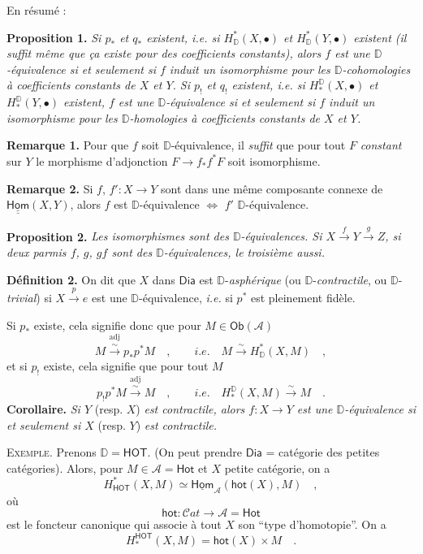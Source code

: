 \documentclass[11pt]{article}
\newcommand{\printedpage}[1]{\marginpar{\footnotesize p.~#1}}
\newcommand{\msp}[1]{\marginpar{\footnotesize [#1]}}
\newcommand{\Ob}{\mathsf{Ob}}
\newcommand{\Dia}{\mathsf{Dia}}
\newcommand{\DD}{\mathbb{D}}
\newcommand{\Hom}{\underline{\mathsf{Hom}}}
\newcommand{\HOT}{\mathsf{HOT}}
\newcommand{\cA}{\mathcal{A}}
\newcommand{\hot}{\mathsf{hot}}
\newcommand{\Hot}{\mathsf{Hot}}
\newcommand{\isolongto}{\overset{\sim}{\longrightarrow}}
\begin{document}
\clearpage
\printedpage{36}
\noindent\msp{page 62}

\noindent En résumé :

\noindent\textbf{Proposition 1.} \textit{Si $p_*$ et $q_*$ existent, i.e. si $H^*_{\DD}(X, \bullet)$ et $H^*_{\DD}(Y, \bullet)$ existent (il suffit même que ça existe pour des coefficients constants), alors $f$ est une $\DD$-équivalence si et seulement si $f$ induit un isomorphisme pour les $\DD$-cohomologies à coefficients constants de $X$ et $Y$. Si $p_!$ et $q_!$ existent, i.e. si $H^{\DD}_*(X, \bullet)$ et $H^{\DD}_*(Y, \bullet)$ existent, $f$ est une $\DD$-équivalence si et seulement si $f$ induit un isomorphisme pour les $\DD$-homologies à coefficients constants de $X$ et $Y$.}

\noindent\textbf{Remarque 1.} Pour que $f$ soit $\DD$-équivalence, il \textit{suffit} que pour tout $F$ \textit{constant} sur $Y$ le morphisme d'adjonction $F \to f_*f^*F$ soit isomorphisme.

\noindent\textbf{Remarque 2.} Si $f$, $f' : X \to Y$ sont dans une même composante connexe de $\underline{\Hom}(X, Y)$, alors $f$ est $\DD$-équivalence $\Leftrightarrow$ $f'$ $\DD$-équivalence.

\noindent\textbf{Proposition 2.} \textit{Les isomorphismes sont des $\DD$-équivalences. Si $X \overset{f}{\to} Y \overset{g}{\to} Z$, si deux parmis $f$, $g$, $gf$ sont des $\DD$-équivalences, le troisième aussi.} %

\noindent\textbf{Définition 2.} On dit que $X$ dans $\Dia$ est $\DD$-\textit{asphérique} (ou $\DD$-\textit{contractile}, ou $\DD$-\textit{trivial}) si $X \overset{p}{\to} e$ est une $\DD$-équivalence, \textit{i.e.} si $p^*$ est pleinement fidèle.

Si $p_*$ existe, cela signifie donc que pour $M \in \Ob(\cA)$
\[
M \overset{\mathrm{adj}}{\isolongto} p_*p^*M \quad , \qquad \textit{i.e.} \quad M \isolongto H^*_{\DD}(X, M) \quad ,
\]
et si $p_!$ existe, cela signifie que pour tout $M$
\[
p_!p^*M \overset{\mathrm{adj}}{\isolongto} M \quad , \qquad \textit{i.e.} \quad H^{\DD}_*(X, M) \isolongto M \quad .
\]
\textbf{Corollaire.} \textit{Si $Y$} (resp. $X$) \textit{est contractile, alors $f : X \to Y$ est une $\DD$-équivalence si et seulement si $X$} (resp. $Y$) \textit{est contractile.}

\noindent\textsc{Exemple}. Prenons $\DD = \HOT$. (On peut prendre $\Dia$ = catégorie des petites catégories). Alors, pour $M \in \cA = \Hot$ et $X$ petite catégorie, on a
\[
H^*_{\HOT}(X, M) \simeq \Hom_{\cA}(\hot(X), M) \quad ,
\]
où
\[
\hot : \mathcal{C}\mathit{at} \longrightarrow \cA = \Hot
\]
est le foncteur canonique qui associe à tout $X$ son “type d'homotopie”. On a
\[
H^{\HOT}_*(X, M) = \hot(X) \times M \quad .
\]
\end{document}
